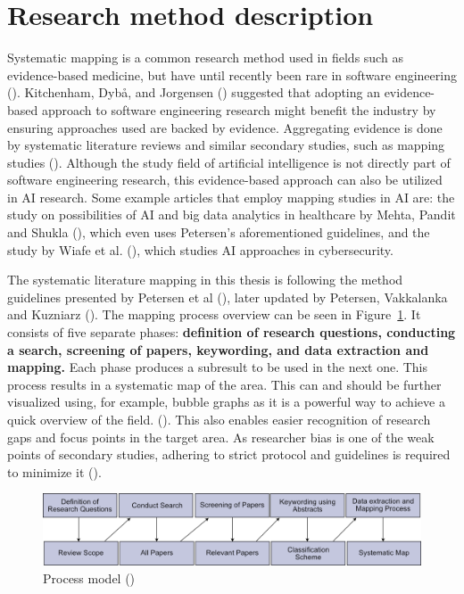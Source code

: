 \section{Research method description}
\label{method_description}

Systematic mapping is a common research method used in fields such as
evidence-based medicine, but have until recently been rare in software
engineering (\cite{petersen2008}). Kitchenham, Dybå, and Jorgensen
(\cite*{kitchenham2004}) suggested that adopting an evidence-based approach to
software engineering research might benefit the industry by ensuring approaches
used are backed by evidence. Aggregating evidence is done by systematic
literature reviews and similar secondary studies, such as mapping studies
(\cite{kitchenham2010}). Although the study field of artificial intelligence is
not directly part of software engineering research, this evidence-based approach
can also be utilized in AI research. Some example articles that employ mapping
studies in AI are: the study on possibilities of AI and big data analytics in
healthcare by Mehta, Pandit and Shukla (\cite*{mehta2019aimapping}), which even
uses Petersen's aforementioned guidelines, and the study by Wiafe et al.
(\cite*{wiafe2020aimapping}), which studies AI approaches in cybersecurity.


The systematic literature mapping in this thesis is following the method
guidelines presented by Petersen et al (\cite*{petersen2008}), later updated by
Petersen, Vakkalanka and Kuzniarz (\cite*{petersen2015}). The mapping process
overview can be seen in Figure~\ref{fig:mapping}. It consists of five separate
phases: \textbf{definition of research questions, conducting a search, screening
of papers, keywording, and data extraction and mapping.} Each phase produces a
subresult to be used in the next one. This process results in a systematic map
of the area. This can and should be further visualized using, for example,
bubble graphs as it is a powerful way to achieve a quick overview of the field.
(\cite{petersen2008}). This also enables easier recognition of research gaps and
focus points in the target area. As researcher bias is one of the weak points of
secondary studies, adhering to strict protocol and guidelines is required to
minimize it (\cite{brereton2007}).


\begin{figure}[H]
  \includegraphics[width=\linewidth]{images/petersen_model.png}
  \caption{Process model (\cite{petersen2008})}
  \label{fig:mapping}
\end{figure}

